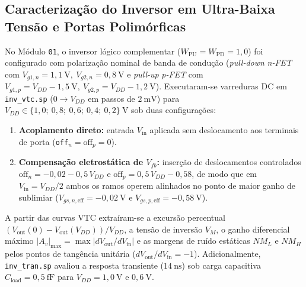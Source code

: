 \subsection{Caracteriza\c{c}\~{a}o do Inversor em Ultra-Baixa Tens\~{a}o e Portas Polim\'{o}rficas}\label{sec:met_inv_poly}

No M\'{o}dulo \texttt{01}, o inversor l\'{o}gico complementar ($W_{\mathrm{PU}} = W_{\mathrm{PD}} = 1{,}0$) foi configurado com polariza\c{c}\~{a}o nominal de banda de condu\c{c}\~{a}o (\textit{pull-down} \textit{n-FET} com $V_{g1,n} = 1{,}1\ \text{V},\ V_{g2,n} = 0{,}8\ \text{V}$ e \textit{pull-up} \textit{p-FET} com $V_{g1,p} = V_{DD} - 1{,}5\ \text{V},\ V_{g2,p} = V_{DD} - 1{,}2\ \text{V}$). Executaram-se varreduras DC em \texttt{inv\_vtc.sp} ($0 \to V_{DD}$ em passos de $2\ \text{mV}$) para $V_{DD} \in \{1{,}0;\ 0{,}8;\ 0{,}6;\ 0{,}4;\ 0{,}2\}\ \text{V}$ sob duas configura\c{c}\~{o}es:
\begin{enumerate}
    \item \textbf{Acoplamento direto:} entrada $V_{\mathrm{in}}$ aplicada sem deslocamento aos terminais de porta (\texttt{off}$_n = \text{off}_p = 0$).
    \item \textbf{Compensa\c{c}\~{a}o eletrost\'{a}tica de $V_{fb}$:} inser\c{c}\~{a}o de deslocamentos controlados $\text{off}_n = -0{,}02 - 0{,}5\,V_{DD}$ e $\text{off}_p = 0{,}5\,V_{DD} - 0{,}58$, de modo que em $V_{\mathrm{in}} = V_{DD}/2$ ambos os ramos operem alinhados no ponto de maior ganho de sublimiar ($V_{gs,n,\mathrm{eff}} = -0{,}02\ \text{V}$ e $V_{gs,p,\mathrm{eff}} = -0{,}58\ \text{V}$).
\end{enumerate}
A partir das curvas VTC extra\'{i}ram-se a excurs\~{a}o percentual $(V_{\mathrm{out}}(0)-V_{\mathrm{out}}(V_{DD}))/V_{DD}$, a tens\~{a}o de invers\~{a}o $V_M$, o ganho diferencial m\'{a}ximo $|A_v|_{\max} = \max|dV_{\mathrm{out}}/dV_{\mathrm{in}}|$ e as margens de ru\'{i}do est\'{a}ticas $NM_L$ e $NM_H$ pelos pontos de tang\^{e}ncia unit\'{a}ria ($dV_{\mathrm{out}}/dV_{\mathrm{in}} = -1$). Adicionalmente, \texttt{inv\_tran.sp} avaliou a resposta transiente ($14\ \text{ns}$) sob carga capacitiva $C_{\mathrm{load}} = 0{,}5\ \text{fF}$ para $V_{DD} = 1{,}0\ \text{V}$ e $0{,}6\ \text{V}$.

